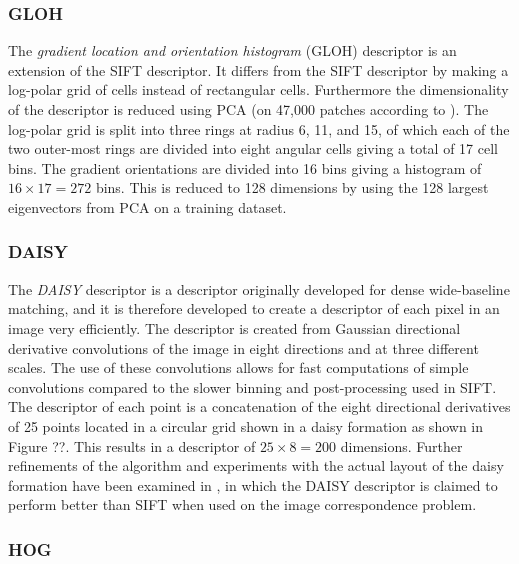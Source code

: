 \documentclass[../thesis.tex]{subfiles}
\begin{document}
\subsubsection{GLOH}

The \emph{gradient location and orientation histogram} (GLOH) descriptor
\cite{mikolajczyk2005performance} is an extension of the SIFT descriptor.
It differs from the SIFT descriptor by making a log-polar grid of
cells instead of rectangular cells. Furthermore the dimensionality of
the descriptor is reduced using PCA (on 47,000 patches according to
\cite{mikolajczyk2005performance}). The log-polar grid is split into three
rings at radius 6, 11, and 15, of which each of the two outer-most rings are
divided into eight angular cells giving a total of 17 cell bins. The gradient
orientations are divided into 16 bins giving a histogram of $16 \times 17
= 272$ bins. This is reduced to 128 dimensions by using the 128 largest
eigenvectors from PCA on a training dataset.

\subsubsection{DAISY}

The \emph{DAISY} descriptor \cite{tola2008fast} is a descriptor originally
developed for dense wide-baseline matching, and it is therefore developed
to create a descriptor of each pixel in an image very efficiently. The
descriptor is created from Gaussian directional derivative convolutions of
the image in eight directions and at three different scales. The use of these
convolutions allows for fast computations of simple convolutions compared
to the slower binning and post-processing used in SIFT. The descriptor of
each point is a concatenation of the eight directional derivatives of 25
points located in a circular grid shown in a daisy formation as shown in
Figure ??. This results in a descriptor of
$25 \times 8 = 200$ dimensions. Further refinements of the algorithm and
experiments with the actual layout of the daisy formation have been examined
in \cite{winder2009picking}, in which the DAISY descriptor is claimed to perform
better than SIFT when used on the image correspondence problem.

\subsubsection{HOG}
\end{document}

